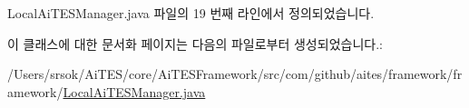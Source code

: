 Local\+Ai\+T\+E\+S\+Manager.\+java 파일의 19 번째 라인에서 정의되었습니다.



이 클래스에 대한 문서화 페이지는 다음의 파일로부터 생성되었습니다.\+:\begin{DoxyCompactItemize}
\item 
/\+Users/srsok/\+Ai\+T\+E\+S/core/\+Ai\+T\+E\+S\+Framework/src/com/github/aites/framework/framework/\mbox{\hyperlink{_local_ai_t_e_s_manager_8java}{Local\+Ai\+T\+E\+S\+Manager.\+java}}\end{DoxyCompactItemize}
